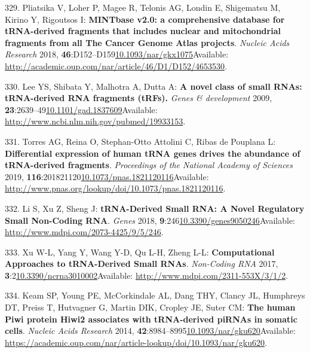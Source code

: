 \documentclass[
]{book}
\begin{document}
\leavevmode\hypertarget{ref-Pliatsika2018}{}%
329. Pliatsika V, Loher P, Magee R, Telonis AG, Londin E, Shigematsu M, Kirino Y, Rigoutsos I: \textbf{MINTbase v2.0: a comprehensive database for tRNA-derived fragments that includes nuclear and mitochondrial fragments from all The Cancer Genome Atlas projects}. \emph{Nucleic Acids Research} 2018, \textbf{46}:D152--D159\href{https://doi.org/10.1093/nar/gkx1075}{10.1093/nar/gkx1075}Available: \url{http://academic.oup.com/nar/article/46/D1/D152/4653530}.

\leavevmode\hypertarget{ref-Lee2009}{}%
330. Lee YS, Shibata Y, Malhotra A, Dutta A: \textbf{A novel class of small RNAs: tRNA-derived RNA fragments (tRFs).} \emph{Genes \& development} 2009, \textbf{23}:2639--49\href{https://doi.org/10.1101/gad.1837609}{10.1101/gad.1837609}Available: \url{http://www.ncbi.nlm.nih.gov/pubmed/19933153}.

\leavevmode\hypertarget{ref-Torres2019}{}%
331. Torres AG, Reina O, Stephan-Otto Attolini C, Ribas de Pouplana L: \textbf{Differential expression of human tRNA genes drives the abundance of tRNA-derived fragments}. \emph{Proceedings of the National Academy of Sciences} 2019, \textbf{116}:201821120\href{https://doi.org/10.1073/pnas.1821120116}{10.1073/pnas.1821120116}Available: \url{http://www.pnas.org/lookup/doi/10.1073/pnas.1821120116}.

\leavevmode\hypertarget{ref-Li2018a}{}%
332. Li S, Xu Z, Sheng J: \textbf{tRNA-Derived Small RNA: A Novel Regulatory Small Non-Coding RNA}. \emph{Genes} 2018, \textbf{9}:246\href{https://doi.org/10.3390/genes9050246}{10.3390/genes9050246}Available: \url{http://www.mdpi.com/2073-4425/9/5/246}.

\leavevmode\hypertarget{ref-Xu2017a}{}%
333. Xu W-L, Yang Y, Wang Y-D, Qu L-H, Zheng L-L: \textbf{Computational Approaches to tRNA-Derived Small RNAs}. \emph{Non-Coding RNA} 2017, \textbf{3}:2\href{https://doi.org/10.3390/ncrna3010002}{10.3390/ncrna3010002}Available: \url{http://www.mdpi.com/2311-553X/3/1/2}.

\leavevmode\hypertarget{ref-Keam2014}{}%
334. Keam SP, Young PE, McCorkindale AL, Dang THY, Clancy JL, Humphreys DT, Preiss T, Hutvagner G, Martin DIK, Cropley JE, Suter CM: \textbf{The human Piwi protein Hiwi2 associates with tRNA-derived piRNAs in somatic cells}. \emph{Nucleic Acids Research} 2014, \textbf{42}:8984--8995\href{https://doi.org/10.1093/nar/gku620}{10.1093/nar/gku620}Available: \url{https://academic.oup.com/nar/article-lookup/doi/10.1093/nar/gku620}.
\end{document}

